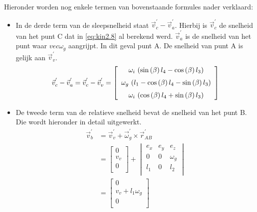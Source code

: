 \newpage
Hieronder worden nog enkele termen van bovenstaande formules nader verklaard:
\begin{itemize}
\item In de derde term van de sleepsnelheid staat $\vec{v}_{c}^{'}-\vec{v}_{a}^{'}$. Hierbij is $\vec{v}_{c}^{'}$ de snelheid van het punt C dat in \eqref{eq:kin2.8} al berekend werd. $\vec{v}_{a}^{'}$ is de snelheid van het punt waar $vec{\omega}_{g}$ aangrijpt. In dit geval punt A. De snelheid van punt A is gelijk aan $\vec{v}_{v}^{'}$. 
\begin{equation}
\vec{v}_{c}^{'}-\vec{v}_{a}^{'}=\vec{v}_{c}^{'}-\vec{v}_{v}^{'}=
\left[ \begin {array}{c} \omega_{i}\, \left( \sin \left( \beta
 \right) l_{4}-\cos \left( \beta \right) l_{3} \right) 
\\ \noalign{\medskip}\omega_{g}\, \left( l_{1}-\cos \left( \beta
 \right) l_{4}-\sin \left( \beta \right) l_{3} \right) 
\\ \noalign{\medskip}\omega_{i}\, \left( \cos \left( \beta \right) l_{4}+\sin \left( \beta \right) l_{3} \right) \end {array} \right]
\label{eq:kin2.13}
\end{equation}
\item De tweede term van de relatieve snelheid bevat de snelheid van het punt B. Die wordt hieronder in detail uitgewerkt.
\begin{equation}
\begin{split}
\vec{v}_{b}^{'}&=\vec{v}_{v}^{'}+\vec{\omega}_{g}^{'}\times\vec{r}_{AB}^{'}\\
&=\begin{bmatrix}
0\\
v_{v}\\
0\\
\end{bmatrix}
+\begin{vmatrix}
e_{x}&e_{y}&e_{z}\\
0&0&\omega_{g}\\
l_{1}&0&l_{2}\\
\end{vmatrix}\\
&=\begin{bmatrix}
0\\
v_{v}+l_{1}\omega_{g}\\
0\\
\end{bmatrix}
\label{eq:kin2.14}
\end{split}
\end{equation}
\end{itemize}
